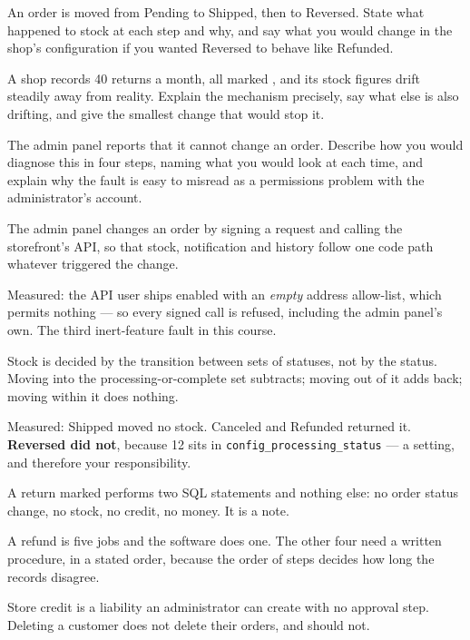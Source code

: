 \begin{checkpoint}
\begin{tightnum}
  \item An order is moved from Pending to Shipped, then to Reversed. State what
        happened to stock at each step and why, and say what you would change in
        the shop's configuration if you wanted Reversed to behave like Refunded.
  \item A shop records 40 returns a month, all marked , and its
        stock figures drift steadily away from reality. Explain the mechanism
        precisely, say what else is also drifting, and give the smallest change
        that would stop it.
  \item The admin panel reports that it cannot change an order. Describe how you
        would diagnose this in four steps, naming what you would look at each
        time, and explain why the fault is easy to misread as a permissions
        problem with the administrator's account.
\end{tightnum}
\end{checkpoint}

\begin{chaptersummary}
\begin{tight}
  \item The admin panel changes an order by signing a request and calling the
        storefront's API, so that stock, notification and history follow one
        code path whatever triggered the change.
  \item Measured: the API user ships enabled with an \emph{empty} address
        allow-list, which permits nothing --- so every signed call is refused,
        including the admin panel's own. The third inert-feature fault in this
        course.
  \item Stock is decided by the transition between sets of statuses, not by the
        status. Moving into the processing-or-complete set subtracts; moving
        out of it adds back; moving within it does nothing.
  \item Measured: Shipped moved no stock. Canceled and Refunded returned it.
        \textbf{Reversed did not}, because 12 sits in
        \texttt{config\_processing\_status} --- a setting, and therefore your
        responsibility.
  \item A return marked  performs two SQL statements and nothing
        else: no order status change, no stock, no credit, no money. It is a
        note.
  \item A refund is five jobs and the software does one. The other four need a
        written procedure, in a stated order, because the order of steps decides
        how long the records disagree.
  \item Store credit is a liability an administrator can create with no approval
        step. Deleting a customer does not delete their orders, and should not.
\end{tight}
\end{chaptersummary}

